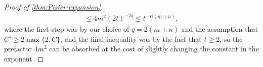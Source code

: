 \documentclass[aos]{imsart}
\theoremstyle{definition}
\numberwithin{equation}{section}
\DeclareMathOperator{\op}{op}
\DeclarePairedDelimiter{\norm}{\lVert}{\rVert}
\newcommand{\E}{\mathbb{E}}
\begin{document}
\begin{appendix}
\begin{proof} [Proof of \cref{thm:Pisier-expansion}]
\begin{align*}
  \leq 4 m^2 (2t)^{-2q} \leq t^{-\Omega(m+n)} , 
\end{align*}
  where the first step was by our choice of $q = 2(m+n)$ and the assumption that $C' \geq 2 \max\{2, C \}$, and the final inequality was by the fact that $t\geq2$, so the prefactor $4 m^{2}$ can be absorbed at the cost of slightly changing the constant in the exponent.

\end{proof}



\end{appendix}
\end{document}
